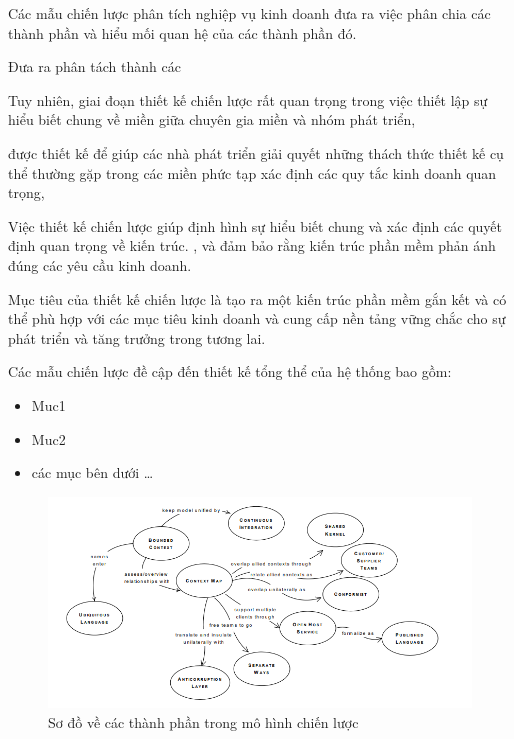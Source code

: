 Các mẫu chiến lược phân tích nghiệp vụ kinh doanh đưa ra việc phân chia các thành phần và hiểu mối quan hệ của các thành phần đó.


Đưa ra phân tách thành các 
%
 
Tuy nhiên, giai đoạn thiết kế chiến lược rất quan trọng trong việc thiết lập sự hiểu biết chung về miền giữa chuyên gia miền và nhóm phát triển, 

được thiết kế để giúp các nhà phát triển giải quyết những thách thức thiết kế cụ thể thường gặp trong các miền phức tạp
xác định các quy tắc kinh doanh quan trọng, 

Việc thiết kế chiến lược giúp định hình sự hiểu biết chung và xác định các quyết định quan trọng về kiến ​​trúc.
, và đảm bảo rằng kiến trúc phần mềm phản ánh đúng các yêu cầu kinh doanh.


%

Mục tiêu của thiết kế chiến lược là tạo ra một kiến trúc phần mềm gắn kết và có thể 
 phù hợp với các mục tiêu kinh doanh và cung cấp nền tảng vững chắc cho sự phát triển và tăng trưởng trong tương lai.

%

Các mẫu chiến lược đề cập đến thiết kế tổng thể của hệ thống bao gồm:

\begin{itemize}

\item Muc1

\item Muc2

\item các mục bên dưới \dots

\end{itemize}

%

\begin{figure}[H]

\centering

\includegraphics[width = 1\textwidth]{pictures/CacMoHinhChienLuoc/temp.png}

\caption{Sơ đồ   về các thành phần trong mô hình chiến lược}

\end{figure}

